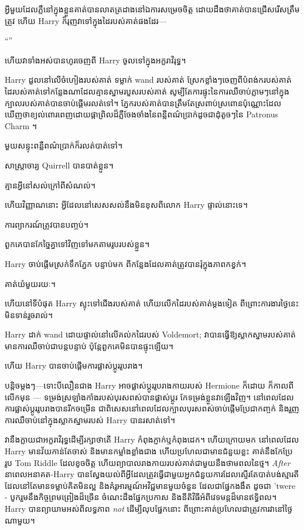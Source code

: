 {អ្វីមួយដែលភ្លឺនៅក្នុងខ្លួនគាត់បានលាតត្រដាងនៅឯការសម្រេចចិត្ត ដោយដឹងថាគាត់បានជ្រើសរើសត្រឹមត្រូវ ហើយ Harry ក៏រុញវាទៅក្នុងដៃរបស់គាត់ផងដែរ—

“\emph{}”

ហើយវាទាំងអស់បានហូរចេញពី Harry ចូលទៅក្នុងអក្ខរាវិរុទ្ធ។

Harry ដួលនៅលើចំហៀងរបស់គាត់ ទម្លាក់ wand របស់គាត់ ស្រែកខ្លាំងៗចេញពីបំពង់ករបស់គាត់ ដៃរបស់គាត់ទៅកន្លែងណាដែលគ្មានស្នាមរបួសរបស់គាត់ សូម្បីតែការផ្ទុះនៃការឈឺចាប់ភ្លាមៗនៅក្នុងក្បាលរបស់គាត់បានចាប់ផ្តើមរលត់ទៅ។ ភ្នែករបស់គាត់បានត្រឹមតែស្រពាប់ស្រពោនប៉ុណ្ណោះដែលឃើញថាខ្យល់ពោរពេញដោយផ្កាព្រិលដ៏ភ្លឺចែងចាំងនៃពន្លឺពណ៌ប្រាក់ដូចជាដុំតូចៗនៃ Patronus Charm ។

មួយ​សន្ទុះ​ពន្លឺ​ពណ៌​ប្រាក់​ក៏​រលត់​បាត់​ទៅ។

សាស្រ្តាចារ្យ Quirrell បានបាត់ខ្លួន។

គ្មានអ្វីនៅសល់ក្រៅពីសំណល់។

ហើយ​វិញ្ញាណ​នោះ អ្វី​ដែល​នៅ​សេសសល់​នឹង​មិន​ខុស​ពី​លោក Harry ផ្ទាល់​នោះ​ទេ។

ការព្យាករណ៍ត្រូវបានបញ្ចប់។

ពួក​គេ​បាន​កែ​ច្នៃ​គ្នា​ទៅ​វិញ​ទៅ​មក​តាម​រូប​របស់​ខ្លួន។

Harry ចាប់ផ្តើមស្រក់ទឹកភ្នែក បន្ទាប់មក ពីកន្លែងដែលគាត់ត្រូវបានរុំក្នុងភាពកខ្វក់។

គាត់យំមួយរយៈ។

ហើយនៅទីបំផុត Harry ស្ទុះទៅជើងរបស់គាត់ ហើយលើកដៃរបស់គាត់ម្តងទៀត ពីព្រោះការងារថ្ងៃនេះមិនទាន់រួចរាល់។

\later

Harry ដាក់ wand ដោយផ្ទាល់នៅលើគល់កដៃរបស់ Voldemort; វាបានធ្វើឱ្យស្លាកស្នាមរបស់គាត់មានការឈឺចាប់ជាបន្តបន្ទាប់ ប៉ុន្តែពួកគេមិនបានផ្ទុះឡើយ។

ហើយ Harry បានចាប់ផ្តើមការផ្លាស់ប្តូររូបរាង។

បន្តិចម្ដងៗ—ទោះបីលឿនជាង Harry អាចផ្លាស់ប្តូររូបរាងកាយរបស់ Hermione ក៏ដោយ ក៏កាលពីលើកមុន — ទម្រង់ស្រឡាំងកាំងរបស់បុរសពស់បានផ្លាស់ប្តូរ កែទម្រង់ខ្លួនវាឡើងវិញ។ នៅពេលដែលការផ្លាស់ប្តូររូបរាងបានរីកចម្រើន ជាពិសេសនៅពេលដែលក្បាលបុរសពស់ចាប់ផ្តើមប្រែជាកញ្ចក់ និងរួញ ការឈឺចាប់នៅក្នុងស្លាកស្នាមរបស់ Harry បានរសាត់ទៅ។

វានឹងក្លាយជាអក្ខរាវិរុទ្ធដើម្បីរក្សាថាតើ Harry កំពុងភ្ញាក់ឬកំពុងដេក។ ហើយក្រោយមក នៅពេលដែល Harry មានវ័យកាន់តែចាស់ និងមានកម្លាំងខ្លាំងជាង ហើយប្រហែលជាមានជំនួយខ្លះ គាត់នឹងកែប្រែរូប Tom Riddle ដែលខូចចិត្ត ហើយព្យាបាលរាងកាយរបស់គាត់ជាមួយនឹងថាមពលនៃថ្ម។ \emph{After} នាពេលអនាគត-Harry បានស្វែងយល់ពីអ្វីដែលត្រូវធ្វើជាមួយអ្នកជំនួយការដែលស្ទើរតែបាត់បង់ស្មារតី ដែលនៅតែមានទម្លាប់គិតមិនល្អ និងគំរូអារម្មណ៍អវិជ្ជមានមួយចំនួន ដែលជាផ្នែកងងឹត ដូចជា 'twere - បូករួមនឹងកិច្ចព្រមព្រៀងដ៏ច្រើន ចំណេះដឹងផ្នែកប្រកាស និងនីតិវិធីអំពីវេទមន្តដ៏មានឥទ្ធិពល។ Harry បានព្យាយាមអស់ពីលទ្ធភាព \emph{not} ដើម្បីលុបផ្នែកនោះ ពីព្រោះគាត់ប្រហែលជាត្រូវការវានៅថ្ងៃណាមួយ។

}

